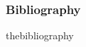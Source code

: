 \documentclass[hyperref={pagebackref=true},table]{beamer}
\begin{document}


\begin{frame}[allowframebreaks]
  \frametitle<presentation>{Bibliography}{thebibliography}

    

    

\end{frame}
\end{document}
